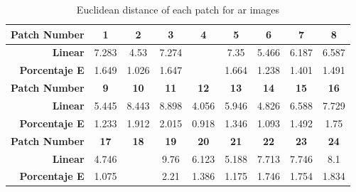 \begin{table}[H]
  \caption{Euclidean distance of each patch for ar images }
  \begin{center}
    \begin{tabularx}{\textwidth}{r c c c c c c c c}
    \toprule
        \textbf{Patch Number} & \textbf{1} & \textbf{2} & \textbf{3} & \textbf{4} & \textbf{5} & \textbf{6} & \textbf{7} & \textbf{8}\\ \midrule 
        \textbf{Linear} &7.283 &4.53 &7.274 &\cellcolor{colorred}{12.56} &7.35 &5.466 &6.187 &6.587\\ 
        \textbf{Porcentaje E} &1.649 &1.026 &1.647 &\cellcolor{colorred}{2.844} &1.664 &1.238 &1.401 &1.491\\ \midrule 
        \textbf{Patch Number} & \textbf{9} & \textbf{10} & \textbf{11} & \textbf{12} & \textbf{13} & \textbf{14} & \textbf{15} & \textbf{16}\\ \midrule 
        \textbf{Linear} &5.445 &8.443 &8.898 &4.056 &5.946 &4.826 &6.588 &7.729\\ 
        \textbf{Porcentaje E} &1.233 &1.912 &2.015 &0.918 &1.346 &1.093 &1.492 &1.75\\ \midrule 
        \textbf{Patch Number} & \textbf{17} & \textbf{18} & \textbf{19} & \textbf{20} & \textbf{21} & \textbf{22} & \textbf{23} & \textbf{24}\\ \midrule 
        \textbf{Linear} &4.746 &\cellcolor{colorgreen}{4.019} &9.76 &6.123 &5.188 &7.713 &7.746 &8.1\\ 
        \textbf{Porcentaje E} &1.075 &\cellcolor{colorgreen}{0.91} &2.21 &1.386 &1.175 &1.746 &1.754 &1.834\\ \midrule 
    \bottomrule
    \end{tabularx}
  \end{center}
\end{table}
